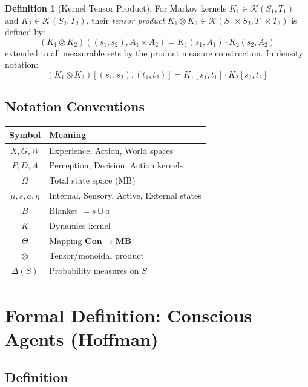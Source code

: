 \documentclass[11pt,a4paper]{article}
\theoremstyle{definition}
\newtheorem{definition}{Definition}[section]
\theoremstyle{plain}
\theoremstyle{remark}
\newcommand{\Con}{\mathbf{Con}}
\newcommand{\MB}{\mathbf{MB}}
\newcommand{\ProbSpace}[1]{\Delta(#1)}
\begin{document}
\begin{definition}[Kernel Tensor Product]\label{def:kernel-tensor}
For Markov kernels $K_1 \in \mathcal{K}(S_1, T_1)$ and $K_2 \in \mathcal{K}(S_2, T_2)$, their \emph{tensor product} $K_1 \otimes K_2 \in \mathcal{K}(S_1 \times S_2, T_1 \times T_2)$ is defined by:
\[
(K_1 \otimes K_2)((s_1, s_2), A_1 \times A_2) = K_1(s_1, A_1) \cdot K_2(s_2, A_2)
\]
extended to all measurable sets by the product measure construction. In density notation:
\[
(K_1 \otimes K_2)[(s_1, s_2), (t_1, t_2)] = K_1[s_1, t_1] \cdot K_2[s_2, t_2]
\]
\end{definition}

\subsection{Notation Conventions}

\begin{center}
\begin{tabular}{cl}
\toprule
\textbf{Symbol} & \textbf{Meaning} \\
\midrule
$X, G, W$ & Experience, Action, World spaces \\
$P, D, A$ & Perception, Decision, Action kernels \\
$\Omega$ & Total state space (MB) \\
$\mu, s, a, \eta$ & Internal, Sensory, Active, External states \\
$B$ & Blanket $= s \cup a$ \\
$K$ & Dynamics kernel \\
$\Theta$ & Mapping $\Con \to \MB$ \\
$\otimes$ & Tensor/monoidal product \\
$\ProbSpace{S}$ & Probability measures on $S$ \\
\bottomrule
\end{tabular}
\end{center}

\section{Formal Definition: Conscious Agents (Hoffman)}

\subsection{Definition}
\end{document}
